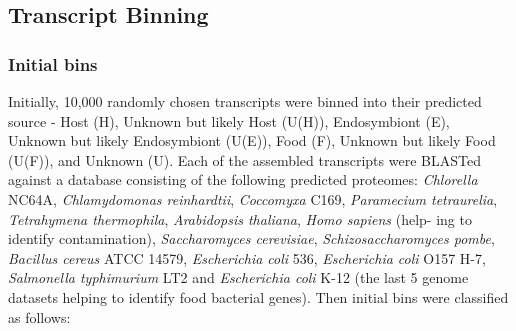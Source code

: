 
\subsection{Transcript Binning}

\subsubsection{Initial bins}

Initially, 10,000 randomly chosen transcripts were binned into their predicted source - 
Host (H), Unknown but likely Host (U(H)), Endosymbiont (E), Unknown but likely Endosymbiont (U(E)), Food (F), Unknown but likely Food (U(F)), and
Unknown (U). 
Each of the assembled transcripts were BLASTed against a database consisting of the following predicted proteomes: 
\textit{Chlorella} NC64A, \textit{Chlamydomonas reinhardtii}, \textit{Coccomyxa} C169,
\textit{Paramecium tetraurelia}, \textit{Tetrahymena thermophila}, \textit{Arabidopsis thaliana}, \textit{Homo sapiens} (help-
    ing to identify contamination), \textit{Saccharomyces cerevisiae}, \textit{Schizosaccharomyces pombe}, \textit{Bacillus
cereus} ATCC 14579, \textit{Escherichia coli} 536, \textit{Escherichia coli} O157 H-7, \textit{Salmonella typhimurium}
LT2 and \textit{Escherichia coli} K-12 (the last 5 genome datasets helping to identify food bacterial
genes). Then initial bins were classified as follows:
